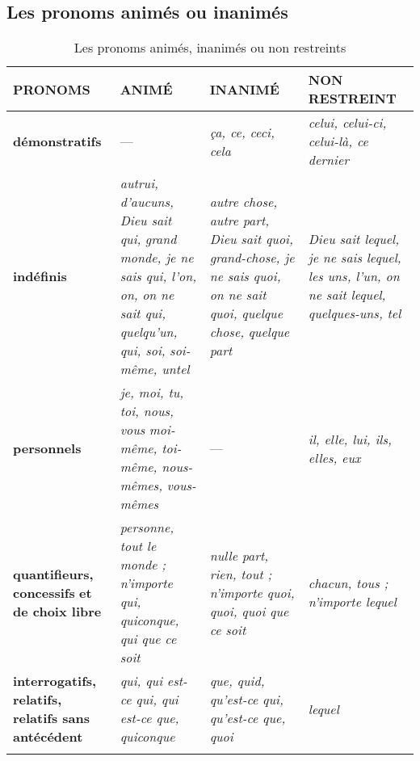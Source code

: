 \documentclass[UTF8]{report}
\begin{document}
\newpage
\subsection{Les pronoms animés ou inanimés}
\begin{longtable}{|>{\raggedright\arraybackslash}p{3cm}|
                    >{\raggedright\arraybackslash}p{3.5cm}|
                    >{\raggedright\arraybackslash}p{3.5cm}|
                    >{\raggedright\arraybackslash}p{3.5cm}|}
\hline
\rowcolor{cyan!20}
\textbf{PRONOMS} & \textbf{ANIMÉ} & \textbf{INANIMÉ} & \textbf{NON RESTREINT} \\
\hline
\textbf{démonstratifs} & --- & \textit{ça, ce, ceci, cela} & \textit{celui, celui-ci, celui-là, ce dernier} \\
\hline
\rowcolor{white}
\textbf{indéfinis} & 
\textit{autrui, d’aucuns, Dieu sait qui,} \newline 
\textit{grand monde, je ne sais qui, l’on, on,} \newline
\textit{on ne sait qui, quelqu’un, qui, soi,} \newline
\textit{soi-même, untel} &
\textit{autre chose, autre part, Dieu sait quoi,} \newline 
\textit{grand-chose, je ne sais quoi,} \newline 
\textit{on ne sait quoi, quelque chose,} \newline 
\textit{quelque part} &
\textit{Dieu sait lequel, je ne sais lequel,} \newline 
\textit{les uns, l’un, on ne sait lequel,} \newline 
\textit{quelques-uns, tel} \\
\hline
\textbf{personnels} & 
\textit{je, moi, tu, toi, nous, vous} \newline 
\textit{moi-même, toi-même, nous-mêmes,} \newline 
\textit{vous-mêmes} & --- &
\textit{il, elle, lui, ils, elles, eux} \\
\hline
\rowcolor{white}
\textbf{quantifieurs, concessifs} \newline 
\textbf{et de choix libre} &
\textit{personne, tout le monde ;} \newline 
\textit{n’importe qui, quiconque,} \newline 
\textit{qui que ce soit} &
\textit{nulle part, rien, tout ;} \newline 
\textit{n’importe quoi, quoi, quoi que ce soit} &
\textit{chacun, tous ;} \newline 
\textit{n’importe lequel} \\
\hline
\textbf{interrogatifs, relatifs,} \newline 
\textbf{relatifs sans antécédent} &
\textit{qui, qui est-ce qui, qui est-ce que,} \newline 
\textit{quiconque} &
\textit{que, quid, qu’est-ce qui,} \newline 
\textit{qu’est-ce que, quoi} &
\textit{lequel} \\
\hline
\caption{ Les pronoms animés, inanimés ou non restreints}
\end{longtable}
\end{document}
